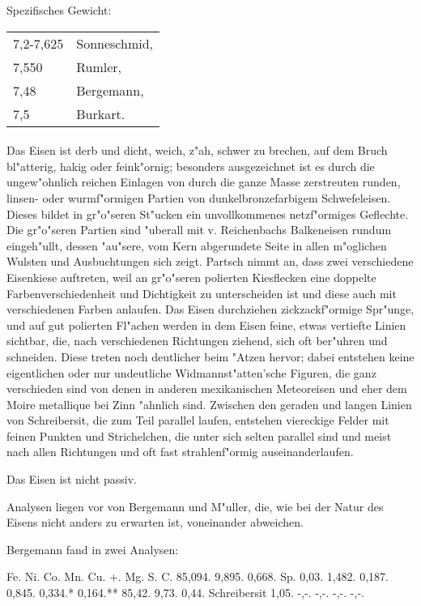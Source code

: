 \documentclass[a4paper, 11pt, oneside]{article}
\begin{document}
Spezifisches Gewicht:  
\begin{table}[!ht]
    \centering
    \begin{tabular}{l l}
        7,2-7,625 & Sonneschmid,\\
        7,550 & Rumler,\\
        7,48 & Bergemann,\\
        7,5 & Burkart.
    \end{tabular}
\end{table}
\paragraph{}
Das Eisen ist derb und dicht, weich, z"ah, schwer zu brechen, auf dem Bruch bl"atterig, hakig oder feink"ornig; besonders ausgezeichnet ist es durch die ungew"ohnlich reichen Einlagen von durch die ganze Masse zerstreuten runden, linsen- oder wurmf"ormigen Partien von dunkelbronzefarbigem Schwefeleisen. Dieses bildet in gr"o"seren St"ucken ein unvollkommenes netzf"ormiges Geflechte. Die gr"o"seren Partien sind "uberall mit v. Reichenbachs Balkeneisen rundum eingeh"ullt, dessen "au"sere, vom Kern abgerundete Seite in allen m"oglichen Wulsten und Ausbuchtungen sich zeigt. Partsch nimmt an, dass zwei verschiedene Eisenkiese auftreten, weil an gr"o"seren polierten Kiesflecken eine doppelte Farbenverschiedenheit und Dichtigkeit zu unterscheiden ist und diese auch mit verschiedenen Farben anlaufen. Das Eisen durchziehen zickzackf"ormige Spr"unge, und auf gut polierten Fl"achen werden in dem Eisen feine, etwas vertiefte Linien sichtbar, die, nach verschiedenen Richtungen ziehend, sich oft ber"uhren und schneiden. Diese treten noch deutlicher beim "Atzen hervor; dabei entstehen keine eigentlichen oder nur undeutliche Widmannst"atten'sche Figuren, die ganz verschieden sind von denen in anderen mexikanischen Meteoreisen und eher dem Moire metallique bei Zinn "ahnlich sind. Zwischen den geraden und langen Linien von Schreibersit, die zum Teil parallel laufen, entstehen viereckige Felder mit feinen Punkten und Strichelchen, die unter sich selten parallel sind und meist nach allen Richtungen und oft fast strahlenf"ormig auseinanderlaufen.

Das Eisen ist nicht passiv.

Analysen liegen vor von Bergemann und M"uller, die, wie bei der Natur des Eisens nicht anders zu erwarten ist, voneinander abweichen.

Bergemann fand in zwei Analysen:

Fe. Ni. Co. Mn. Cu. +. Mg. S. C.  
85,094. 9,895. 0,668. Sp. 0,03. 1,482. 0,187. 0,845. {0,334.* 0,164.**}  
85,42. 9,73. 0,44. Schreibersit 1,05. -,-. -,-. -,-. -,-.
\end{document}
